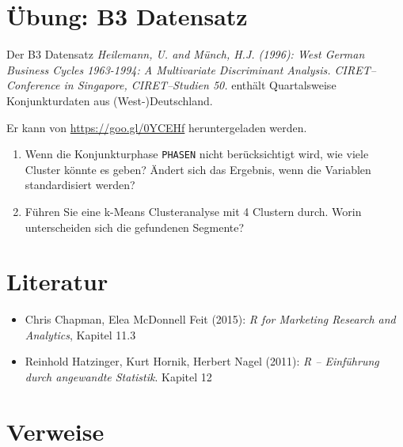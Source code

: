 \documentclass[12pt,ngerman,]{book}
\providecommand{\tightlist}{%
  \setlength{\itemsep}{0pt}\setlength{\parskip}{0pt}}
\begin{document}
\section{Übung: B3 Datensatz}\label{ubung-b3-datensatz}

Der B3 Datensatz \emph{Heilemann, U. and Münch, H.J. (1996): West German
Business Cycles 1963-1994: A Multivariate Discriminant Analysis.
CIRET--Conference in Singapore, CIRET--Studien 50.} enthält
Quartalsweise Konjunkturdaten aus (West-)Deutschland.

Er kann von \url{https://goo.gl/0YCEHf} heruntergeladen werden.

\begin{enumerate}
\def\labelenumi{\arabic{enumi}.}
\tightlist
\item
  Wenn die Konjunkturphase \texttt{PHASEN} nicht berücksichtigt wird,
  wie viele Cluster könnte es geben? Ändert sich das Ergebnis, wenn die
  Variablen standardisiert werden?
\item
  Führen Sie eine k-Means Clusteranalyse mit 4 Clustern durch. Worin
  unterscheiden sich die gefundenen Segmente?
\end{enumerate}

\section{Literatur}\label{literatur-1}

\begin{itemize}
\tightlist
\item
  Chris Chapman, Elea McDonnell Feit (2015): \emph{R for Marketing
  Research and Analytics}, Kapitel 11.3
\item
  Reinhold Hatzinger, Kurt Hornik, Herbert Nagel (2011): \emph{R --
  Einführung durch angewandte Statistik}. Kapitel 12
\end{itemize}

\section{Verweise}\label{verweise-8}
\end{document}
